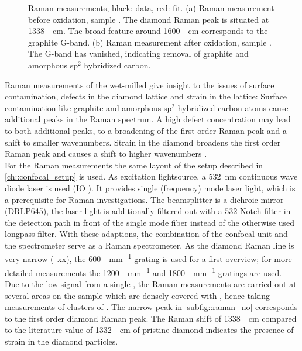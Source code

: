 \begin{figure}
\begin{subfigure}[tp]{0.45\linewidth}
			\end{subfigure}
			\caption{Raman measurements, black: data, red: fit. (a) Raman measurement before oxidation, sample \insituS. The diamond Raman peak is situated at \SI{1338}{\per\centi\meter}. The broad feature around \SI{1600}{\per\centi\meter} corresponds to the graphite G-band. (b) Raman measurement after oxidation, sample \insituSo. The G-band has vanished, indicating removal of graphite and amorphous sp$^2$ hybridized carbon.}
			\label{fig::raman}
		\end{figure}

		Raman measurements of the wet-milled \nds give insight to the issues of surface contamination, defects in the diamond lattice and strain in the lattice:
		Surface contamination like graphite and amorphous sp$^2$ hybridized carbon atoms cause additional peaks in the Raman spectrum. 
		A high defect concentration may lead to both additional peaks, to a broadening of the first order Raman peak and a shift to smaller wavenumbers.
		Strain in the diamond broadens the first order Raman peak and causes a shift to higher wavenumbers \cite{Zaitsev2001,Prawer2004,Orwa2000}.
		\\
		For the Raman measurements the same layout of the setup described in \autoref{ch::confocal_setup} is used.
		As excitation lightsource, a \SI{532}{nm} continuous wave diode laser is used (IO ).
		It provides single (frequency) mode laser light, which is a prerequisite for Raman investigations.
		The beamsplitter is a dichroic mirror (DRLP645), the laser light is additionally filtered out with a 532 Notch filter in the detection path in front of the single mode fiber instead of the otherwise used longpass filter.
		With these adaptions, the combination of the confocal unit and the spectrometer serve as a Raman spectrometer.
		As the diamond Raman line is very narrow (~xx), the \SI[per-mode=symbol]{600}{\lines\per\mm} grating is used for a first overview; for more detailed measurements the \SI[per-mode=symbol]{1200}{\lines\per\mm} and \SI[per-mode=symbol]{1800}{\lines\per\mm} gratings are used.
		\\
		Due to the low signal from a single \nd, the Raman measurements are carried out at several areas on the sample \insituS which are densely covered with \nds, hence taking measurements of clusters of \nds.
		The narrow peak in \autoref{subfig::raman_no} corresponds to the first order diamond Raman peak.
		The Raman shift of \SI{1338}{\per\centi\meter} compared to the literature value of \SI{1332}{\per\centi\meter} of pristine diamond \cite{Zaitsev2001} indicates the presence of strain in the diamond particles.
